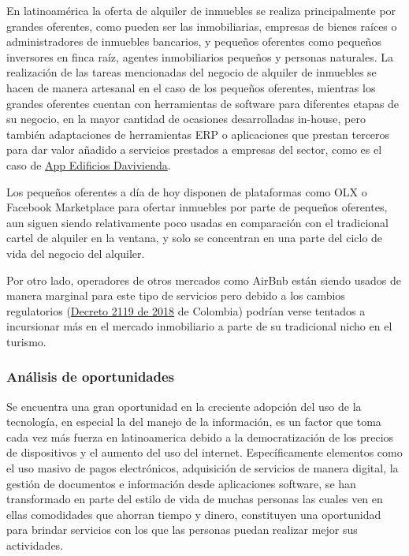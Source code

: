 \documentclass[letterpaper]{article}
\begin{document}
En latinoamérica la oferta de alquiler de inmuebles se realiza principalmente por grandes oferentes, como pueden ser las inmobiliarias, empresas de bienes raíces o administradores de inmuebles bancarios, y pequeños oferentes como pequeños inversores en finca raíz, agentes inmobiliarios pequeños y personas naturales.
La realización de las tareas mencionadas del negocio de alquiler de inmuebles se hacen de manera artesanal en el caso de los pequeños oferentes, mientras los grandes oferentes cuentan con herramientas de software para diferentes etapas de su negocio, en la mayor cantidad de ocasiones desarrolladas in-house, pero también adaptaciones de herramientas ERP o aplicaciones que prestan terceros para dar valor añadido a servicios prestados a empresas del sector, como es el caso de \href{https://www.revistanovedadesdavivienda.com/con-app-edificios-davivienda-pague-su-administracion-rapido-y-facil/}{App Edificios Davivienda}.

Los pequeños oferentes a día de hoy disponen de plataformas como OLX o Facebook Marketplace para ofertar inmuebles por parte de pequeños oferentes, aun siguen siendo relativamente poco usadas en comparación con el tradicional cartel de alquiler en la ventana, y solo se concentran en una parte del ciclo de vida del negocio del alquiler.

Por otro lado, operadores de otros mercados como AirBnb están siendo usados de manera marginal para este tipo de servicios pero debido a los cambios regulatorios (\href{https://www.elespectador.com/noticias/economia/gobierno-establece-marco-legal-para-formalizar-alojamiento-turistico/}{Decreto 2119 de 2018} de Colombia) podrían verse tentados a incursionar más en el mercado inmobiliario a parte de su tradicional nicho en el turismo.

\subsubsection{Análisis de oportunidades}

Se encuentra una gran oportunidad en la creciente adopción del uso de la tecnología, en especial la del manejo de la información, es un factor que toma cada vez más fuerza en latinoamerica debido a la democratización de los precios de dispositivos y el aumento del uso del internet. Específicamente elementos como el uso masivo de pagos electrónicos, adquisición de servicios de manera digital, la gestión de documentos e información desde aplicaciones software, se han transformado en parte del estilo de vida de muchas personas las cuales ven en ellas comodidades que ahorran tiempo y dinero, constituyen una oportunidad para brindar servicios con los que las personas puedan realizar mejor sus actividades.
\end{document}
